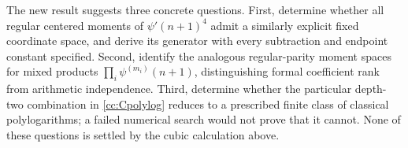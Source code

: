 The new result suggests three concrete questions.  First, determine
whether all regular centered moments of $\psi'(n+1)^4$ admit a
similarly explicit fixed coordinate space, and derive its generator
with every subtraction and endpoint constant specified.  Second,
identify the analogous regular-parity moment spaces for mixed products
$\prod_i\psi^{(m_i)}(n+1)$, distinguishing formal coefficient rank
from arithmetic independence.  Third, determine whether the particular
depth-two combination in \eqref{cc:Cpolylog} reduces to a prescribed
finite class of classical polylogarithms; a failed numerical search
would not prove that it cannot.  None of these questions is settled
by the cubic calculation above.

